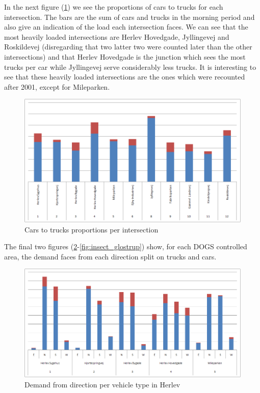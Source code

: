 In the next figure (\ref{fig:cars2trucks_insect}) we see the proportions of cars to trucks for each intersection. The bars are the sum of cars and trucks in the morning period and also give an indication of the load each intersection faces. We can see that the most heavily loaded intersections are Herlev Hovedgade, Jyllingevej and Roskildevej (disregarding that two latter two were counted later than the other intersections) and that Herlev Hovedgade is the junction which sees the most trucks per car while Jyllingevej serve considerably less trucks. It is interesting to see that these heavily loaded intersections are the ones which were recounted after 2001, except for Mileparken.

\begin{figure}[!ht]
\begin{center}
\includegraphics[scale=0.35]{cars_vs_trucks_all_intersections.png} 
\end{center}
\caption{Cars to trucks proportions per intersection}
\label{fig:cars2trucks_insect}
\end{figure}

The final two figures (\ref{fig:insect_herlev}-\ref{fig:insect_glostrup}) show, for each DOGS controlled area, the demand faces from each direction split on trucks and cars. 

\begin{figure}[ht]
\begin{center}
\includegraphics[scale=0.30]{demand_from_direction_per_intersection_herlev.png} 
\end{center}
\caption{Demand from direction per vehicle type in Herlev}
\label{fig:insect_herlev}
\end{figure}  
    
